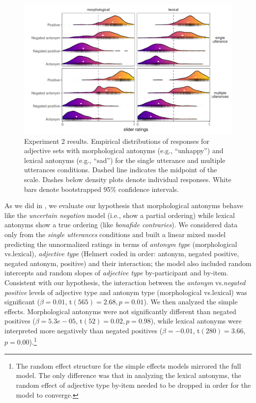 \documentclass[floatsintext,doc]{apa6}
\let\rmarkdownfootnote\footnote%
\def\footnote{\protect\rmarkdownfootnote}
\begin{document}
\begin{figure}[h]
\centering \includegraphics[width=0.95\linewidth]{figs/expt2_ridges_wCIs} 
\caption{Experiment 2 results. Empirical distributions of responses for adjective sets with morphological antonyms (e.g., ``unhappy'') and lexical antonyms (e.g., ``sad'') for the single utterance and multiple utterances conditions. Dashed line indicates the midpoint of the scale. Dashes below density plots denote individual responses. White bars denote bootstrapped 95\% confidence intervals.}
\label{fig:expt2-results}
\end{figure}

As we did in , we evaluate our hypothesis that morphological antonyms behave like the \emph{uncertain negation} model (i.e., show a partial ordering) while lexical antonyms show a true ordering (like \emph{bonafide contraries}).
We considered data only from the \emph{single utterances} conditions and built a linear mixed model predicting the unnormalized ratings in terms of \emph{antonym type} (morphological vs.\text{~}lexical), \emph{adjective type} (Helmert coded in order: antonym, negated positive, negated antonym, positive) and their interaction; the model also included random intercepts and random slopes of \emph{adjective type} by-participant and by-item.
Consistent with our hypothesis, the interaction between the \emph{antonym} vs.\text{~}\emph{negated positive} levels of adjective type and antonym type (morphological vs.\text{~}lexical) was significant (\(\beta = 0.01\), t\((565) = 2.68, p = 0.01\)).
We then analyzed the simple effects.
Morphological antonyms were not significantly different than negated positives (\(\beta = 5.3e-05\), t\((52) = 0.02, p = 0.98\)), while lexical antonyms were interpreted more negatively than negated positives (\(\beta = -0.01\), t\((280) = 3.66\),
\(p = 0.00\)).\footnote{The random effect structure for the simple effects models mirrored the full model. The only difference was that in analyzing the lexical antonyms, the random effect of adjective type by-item needed to be dropped in order for the model to converge.}
\end{document}
